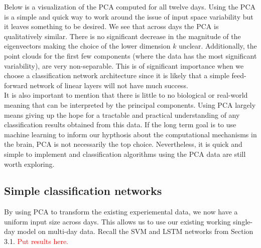 \documentclass[12pt]{article}
\begin{document}
Below is a visualization of the PCA computed for all twelve days. Using the PCA is a simple and quick way to work around the issue of input space variability but it leaves something to be desired. We see that across days the PCA is qualitatively similar. There is no significant decrease in the magnitude of the eigenvectors making the choice of the lower dimension $k$ unclear. Additionally, the point clouds for the first few components (where the data has the most significant variability), are very non-separable. This is of significant importance when we choose a classification network architecture since it is likely that a simple feed-forward network of linear layers will not have much success. \\
It is also important to mention that there is little to no biological or real-world meaning that can be interpreted by the principal components. Using PCA largely means giving up the hope for a tractable and practical understanding of any classification results obtained from this data. If the long term goal is to use machine learning to inform our hypthosis about the computational mechanisms in the brain, PCA is not necessarily the top choice. Nevertheless, it is quick and simple to implement and classification algorithms using the PCA data are still worth exploring.
\subsection{Simple classification networks}
By using PCA to transform the existing experiemental data, we now have a uniform input size across days. This allows us to use our existing working single-day model on multi-day data. Recall the SVM and LSTM networks from Section 3.1. \textcolor{red}{Put results here.}
\end{document}
